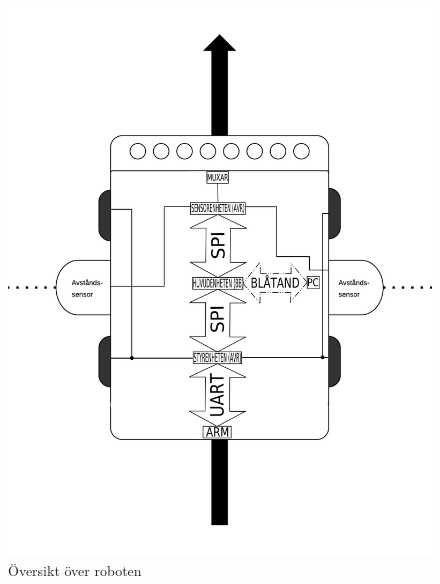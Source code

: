 \begin{figure}[h!]
\center
\includegraphics[scale=0.32]{grafik/robot}
\caption{Översikt över roboten} \label{designspec:robot}
\end{figure}
